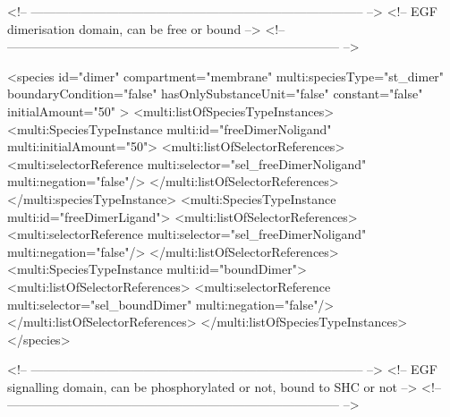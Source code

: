 \begin{example}
<!-- -------------------------------------------------------------------------------- -->
<!-- EGF dimerisation domain, can be free or bound                                    -->
<!-- -------------------------------------------------------------------------------- -->

      <species id="dimer" compartment="membrane" multi:speciesType="st_dimer"
               boundaryCondition="false" hasOnlySubstanceUnit="false" 
               constant="false" initialAmount="50" >
        <multi:listOfSpeciesTypeInstances>
          <multi:SpeciesTypeInstance multi:id="freeDimerNoligand" multi:initialAmount="50">
            <multi:listOfSelectorReferences>
              <multi:selectorReference multi:selector="sel_freeDimerNoligand" multi:negation="false"/>
            </multi:listOfSelectorReferences>
          </multi:speciesTypeInstance>
          <multi:SpeciesTypeInstance multi:id="freeDimerLigand">
            <multi:listOfSelectorReferences>
              <multi:selectorReference multi:selector="sel_freeDimerNoligand" multi:negation="false"/>
            </multi:listOfSelectorReferences>
          <multi:SpeciesTypeInstance multi:id="boundDimer">
            <multi:listOfSelectorReferences>
              <multi:selectorReference multi:selector="sel_boundDimer" multi:negation="false"/>
            </multi:listOfSelectorReferences>
        </multi:listOfSpeciesTypeInstances>
      </species>

<!-- -------------------------------------------------------------------------------- -->
<!-- EGF signalling domain, can be phosphorylated or not, bound to SHC or not         -->
<!-- -------------------------------------------------------------------------------- -->


\end{example}
